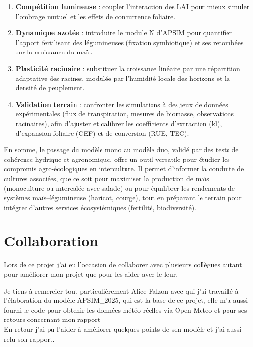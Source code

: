 \documentclass[
]{article}
\begin{document}
\begin{enumerate}
  \begin{enumerate}
  \def\labelenumii{\arabic{enumii}.}
  \item
    \textbf{Compétition lumineuse} : coupler l'interaction des LAI pour
    mieux simuler l'ombrage mutuel et les effets de concurrence
    foliaire.
  \item
    \textbf{Dynamique azotée} : introduire le module N d'APSIM pour
    quantifier l'apport fertilisant des légumineuses (fixation
    symbiotique) et ses retombées sur la croissance du maïs.
  \item
    \textbf{Plasticité racinaire} : substituer la croissance linéaire
    par une répartition adaptative des racines, modulée par l'humidité
    locale des horizons et la densité de peuplement.
  \item
    \textbf{Validation terrain} : confronter les simulations à des jeux
    de données expérimentales (flux de transpiration, mesures de
    biomasse, observations racinaires), afin d'ajuster et calibrer les
    coefficients d'extraction (kl), d'expansion foliaire (CEF) et de
    conversion (RUE, TEC).
  \end{enumerate}
\end{enumerate}

En somme, le passage du modèle mono au modèle duo, validé par des tests
de cohérence hydrique et agronomique, offre un outil versatile pour
étudier les compromis agro‐écologiques en interculture. Il permet
d'informer la conduite de cultures associées, que ce soit pour maximiser
la production de maïs (monoculture ou intercalée avec salade) ou pour
équilibrer les rendements de systèmes maïs--légumineuse (haricot,
courge), tout en préparant le terrain pour intégrer d'autres services
écosystémiques (fertilité, biodiversité).

\section{Collaboration}\label{collaboration}

Lors de ce projet j'ai eu l'occasion de collaborer avec plusieurs
collègues autant pour améliorer mon projet que pour les aider avec le
leur.

Je tiens à remercier tout particulièrement Alice Falzon avec qui j'ai
travaillé à l'élaboration du modèle APSIM\_2025, qui est la base de ce
projet, elle m'a aussi fourni le code pour obtenir les données météo
réelles via Open-Meteo et pour ses retours concernant mon rapport.\\
En retour j'ai pu l'aider à améliorer quelques points de son modèle et
j'ai aussi relu son rapport.
\end{document}
